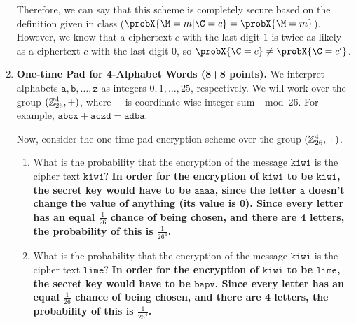 \documentclass[11pt]{article}
\begin{document}
\begin{enumerate}
{    Therefore, we can say that this scheme is completely secure based on the definition given in class ($\probX{\M=m \vert \C=c} = \probX{\M=m}$). However, we know that a ciphertext $c$ with the last digit $1$ is twice as likely as a ciphertext $c$ with the last digit $0$, so $\probX{\C=c} \neq \probX{\C=c'}$.
    }
     \newpage
     

\item {\bfseries One-time Pad for 4-Alphabet Words (8+8 points).} 
  We interpret alphabets $\mathtt a,\mathtt b,\dotsc,\mathtt z$ as integers $0,1,\dotsc,25$, respectively. 
  We will work over the group $({\mathbb Z}^4_{26},+)$, where $+$ is coordinate-wise integer sum $\mod 26$. 
  For example, $\mathtt{abcx} + \mathtt{aczd} = \mathtt{a d b a}$. 
  
  Now, consider the one-time pad encryption scheme over the group $({\mathbb Z}^4_{26},+)$. 
  \begin{enumerate}
  \item What is the probability that the encryption of the message $\mathtt{kiwi}$ is the cipher text $\mathtt{kiwi}$? \newline
    {\bfseries
    \newline
    \newline
      In order for the encryption of $\mathtt{kiwi}$ to be $\mathtt{kiwi}$, the secret key would have to be $\mathtt{aaaa}$, since the letter $\mathtt{a}$ doesn't change the value of anything (its value is 0). Since every letter has an equal $\frac1{26}$ chance of being chosen, and there are 4 letters, the probability of this is $\frac{1}{26^4}$.
    }
     \vspace{0.3\textheight}
  \item What is the probability that the encryption of the message $\mathtt{kiwi}$ is the cipher text $\mathtt{lime}$? \newline 
    {\bfseries
    \newline
    \newline
      In order for the encryption of $\mathtt{kiwi}$ to be $\mathtt{lime}$, the secret key would have to be $\mathtt{bapv}$. Since every letter has an equal $\frac1{26}$ chance of being chosen, and there are 4 letters, the probability of this is $\frac{1}{26^4}$.
      }
     \newpage
  \end{enumerate}  


\end{enumerate}
\end{document}
